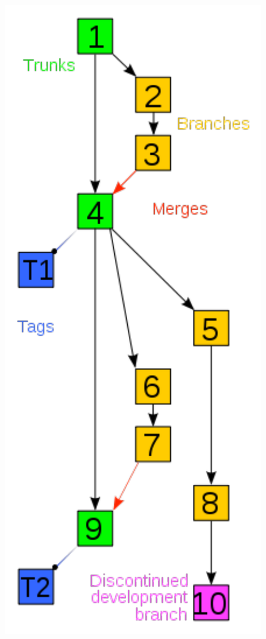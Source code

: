 \begin{frame}
\begin{columns}[T]
\begin{column}{.25\textwidth}
      \includegraphics[width=.7\textwidth]{220px-Revision_controlled_project_visualization-2010-24-02.pdf}
    \end{column}
  \end{columns}
\end{frame}

